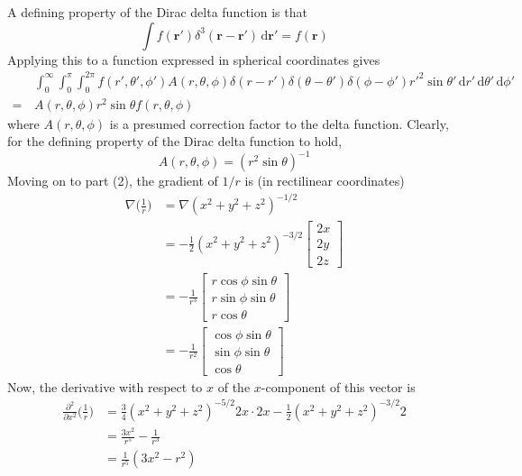 \documentclass[../principles-of-quantum-mechanics.tex]{subfiles}
\begin{document}
\begin{questions}
		\begin{solution}
			A defining property of the Dirac delta function is that
			$$\int f(\mathbf{r}')\delta^3(\mathbf{r} - \mathbf{r}')\,\mathrm{d}\mathbf{r}' = f(\mathbf{r})$$
			Applying this to a function expressed in spherical coordinates gives
			\begin{align*}
				&\int_0^\infty\int_0^\pi\int_0^{2\pi}f(r', \theta', \phi')A(r, \theta, \phi)\delta(r - r')\delta(\theta - \theta')\delta(\phi - \phi')r'^2\sin\theta'\,\mathrm{d}r'\,\mathrm{d}\theta'\,\mathrm{d}\phi' \\
				=\,&A(r, \theta, \phi)r^2\sin\theta f(r, \theta, \phi)
			\end{align*}
			where $A(r, \theta, \phi)$ is a presumed correction factor to the delta function. Clearly, for the defining property of the Dirac delta function to hold, 
			$$A(r, \theta, \phi) = (r^2\sin\theta)^{-1}$$
			Moving on to part (2), the gradient of $1/r$ is (in rectilinear coordinates)
			\begin{align*}
				\nabla\Big(\frac{1}{r}\Big) &= \nabla(x^2 + y^2 + z^2)^{-1/2} \\
				&= -\frac{1}{2}(x^2 + y^2 + z^2)^{-3/2}\begin{bmatrix}
					2x \\ 2y \\ 2z
				\end{bmatrix} \\
				&= -\frac{1}{r^3}\begin{bmatrix}
					r\cos\phi\sin\theta \\
					r\sin\phi\sin\theta \\
					r\cos\theta
				\end{bmatrix} \\
				&= -\frac{1}{r^2}\begin{bmatrix}\cos\phi\sin\theta \\ \sin\phi\sin\theta \\ \cos\theta\end{bmatrix}
			\end{align*}
			Now, the derivative with respect to $x$ of the $x$-component of this vector is
			\begin{align*}
				\frac{\partial^2}{\partial x^2}\Big(\frac{1}{r}\Big) &= \frac{3}{4}(x^2 + y^2 + z^2)^{-5/2}2x\cdot 2x - \frac{1}{2}(x^2 + y^2 + z^2)^{-3/2}2 \\
				&= \frac{3x^2}{r^5} - \frac{1}{r^3} \\
				&= \frac{1}{r^5}(3x^2 - r^2)
			\end{align*}

\end{solution}
\end{questions}
\end{document}
